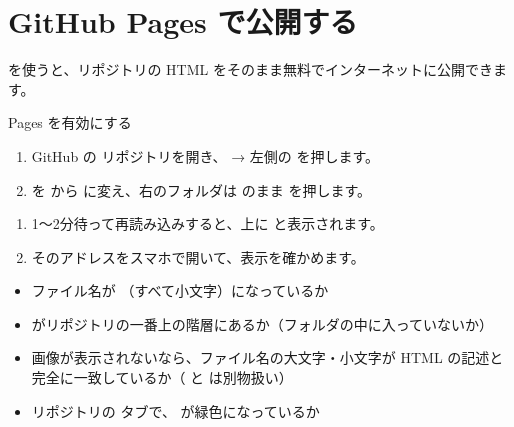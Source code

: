 
\section{GitHub Pages で公開する}

 を使うと、リポジトリの HTML をそのまま無料でインターネットに公開できます。

\begin{step}{Pages を有効にする}
\begin{enumerate}
  \item GitHub の  リポジトリを開き、 → 左側の  を押します。
  \item {} を  から  に変え、右のフォルダは  のまま  を押します。
\end{enumerate}
\begin{enumerate}[resume]
  \item 1〜2分待って再読み込みすると、上に  と表示されます。
  \item そのアドレスをスマホで開いて、表示を確かめます。
\end{enumerate}
\end{step}

\begin{tip}[公開されないときのチェック]
\begin{itemize}
  \item ファイル名が （すべて小文字）になっているか
  \item {} がリポジトリの一番上の階層にあるか（フォルダの中に入っていないか）
  \item 画像が表示されないなら、ファイル名の大文字・小文字が HTML の記述と完全に一致しているか（ と  は別物扱い）
  \item リポジトリの  タブで、 が緑色になっているか
\end{itemize}
\end{tip}



